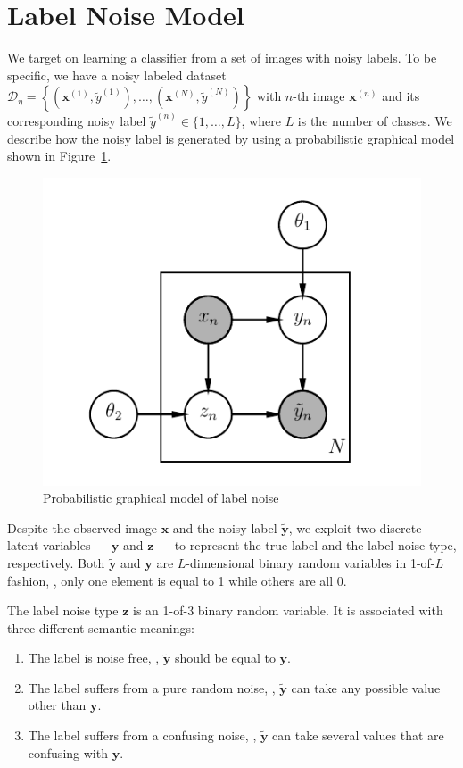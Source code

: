 \documentclass[10pt,twocolumn,letterpaper]{article}
\def\vec{\mathbf}
\begin{document}
\section{Label Noise Model} %
\label{sec:label_noise_model}
We target on learning a classifier from a set of images with noisy labels. To be specific, we have a noisy labeled dataset $\mathcal{D}_{\eta}=\left\{\left(\vec{x}^{(1)}, \tilde{y}^{(1)}\right), \dots, \left(\vec{x}^{(N)}, \tilde{y}^{(N)}\right)\right\}$ with $n$-th image $\vec{x}^{(n)}$ and its corresponding noisy label $\tilde{y}^{(n)} \in \{1,\dots,L\}$, where $L$ is the number of classes. We describe how the noisy label is generated by using a probabilistic graphical model shown in Figure~\ref{fig:noise_pgm}.

\begin{figure}[h!]
\begin{center}
\includegraphics[width=0.6\linewidth]{figure/pgm.pdf}
\end{center}
\caption{Probabilistic graphical model of label noise}
\label{fig:noise_pgm}
\end{figure}

Despite the observed image $\vec{x}$ and the noisy label $\tilde{\vec{y}}$, we exploit two discrete latent variables --- $\vec{y}$ and $\vec{z}$ --- to represent the true label and the label noise type, respectively. Both $\tilde{\vec{y}}$ and $\vec{y}$ are $L$-dimensional binary random variables in 1-of-$L$ fashion, \ie, only one element is equal to 1 while others are all 0.

The label noise type $\vec{z}$ is an 1-of-3 binary random variable. It is associated with three different semantic meanings:
\begin{enumerate}
    \item The label is noise free, \ie, $\tilde{\vec{y}}$ should be equal to $\vec{y}$.
    \item The label suffers from a pure random noise, \ie, $\tilde{\vec{y}}$ can take any possible value other than $\vec{y}$.
    \item The label suffers from a confusing noise, \ie, $\tilde{\vec{y}}$ can take several values that are confusing with $\vec{y}$.
\end{enumerate}
\end{document}
